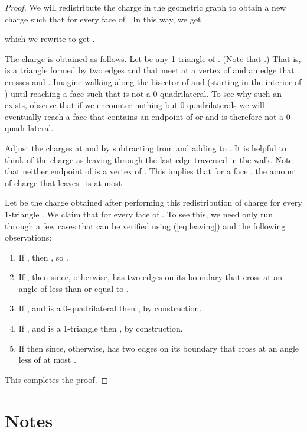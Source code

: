 \documentclass{patmorin}
\newcommand{\eqref}[1]{(\ref{eq:#1})}
\begin{document}
\begin{proof}
We will redistribute the charge in the geometric graph  to obtain a new charge 
such that  for every face  of .  In this way, we
get

which we rewrite to get .

The charge  is obtained as follows.  Let  be any 1-triangle of
.  (Note that .)   That is,  is a triangle formed by two
edges  and  that meet at a vertex  of  and an edge  that
crosses  and .
Imagine walking along the bisector of  and  (starting in the
interior of ) until reaching a face  such that  is not a
0-quadrilateral.  To see why such an  exists, observe that if we
encounter nothing but 0-quadrilaterals we will eventually reach a face that
contains an endpoint of  or  and is therefore not a
0-quadrilateral.

Adjust the charges at  and  by subtracting  from  and
adding  to .  It is helpful to think of the charge as leaving
 through the last edge  traversed in the walk.  Note that neither
endpoint of  is a vertex of .  This implies that for a face ,
the amount of charge that leaves~ is at most

Let  be the charge obtained after performing this redistribution of
charge for every 1-triangle .  We claim that  for every face  of .  To
see this, we need only run through a few cases that can be verified using
\eqref{leaving} and the following observations:

\begin{enumerate}
\item If , then , so .

\item If , then  since, otherwise,  has two edges on
its boundary that cross at an angle of less than or equal to .

\item If , and  is a 0-quadrilateral then , by construction.

\item If , and  is a 1-triangle then , by construction.

\item If  then  since, otherwise,  has two edges on
its boundary that cross at an angle less of at most .
\end{enumerate}
This completes the proof.
\end{proof}


\section{Notes}
\end{document}
